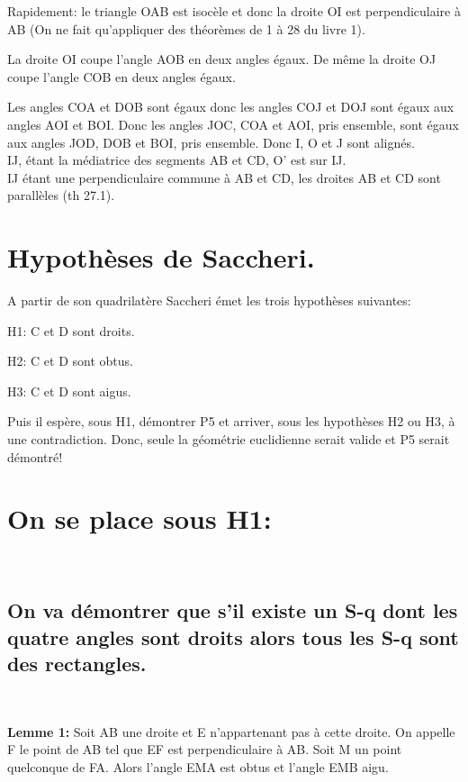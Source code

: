 \documentclass[a4paper, 12pt, twoside]{book}
\begin{document}
Rapidement:  le triangle OAB est isocèle et donc la droite OI est perpendiculaire à AB (On ne fait qu'appliquer des théorèmes de 1 à 28 du livre 1).\

La droite OI coupe l'angle AOB en deux angles égaux. De même la droite OJ coupe l'angle COB en deux angles égaux.\

 Les angles COA et DOB sont égaux donc les angles COJ et DOJ sont égaux aux angles AOI et BOI. Donc les angles JOC, COA et AOI, pris ensemble, sont égaux aux angles JOD, DOB et BOI, pris ensemble. Donc I, O et J sont alignés.\\
 

IJ, étant la médiatrice des segments AB et CD, O' est sur IJ. \\



IJ étant une perpendiculaire commune à AB et CD, les droites AB et CD sont parallèles (th 27.1).\\

\section{Hypothèses de Saccheri.}






A partir de son quadrilatère Saccheri émet les trois hypothèses suivantes:\

H1: C et D sont droits.\

H2: C et D sont obtus.\

H3: C et D sont aigus.\

Puis il espère, sous H1, démontrer P5 et  arriver, sous les hypothèses H2 ou H3, à une contradiction. Donc, seule la géométrie euclidienne serait valide et P5 serait démontré!\


\section{On se place sous H1:}\


\subsection{On va démontrer que s'il existe un S-q dont les quatre angles sont droits alors tous les S-q sont des rectangles.}
\



\textbf{Lemme 1:} Soit AB une droite et E n'appartenant pas à cette droite. On appelle F le point de AB tel que EF est perpendiculaire à AB. Soit M un point quelconque de FA. Alors l'angle EMA est obtus et l'angle EMB aigu.\\
\end{document}
